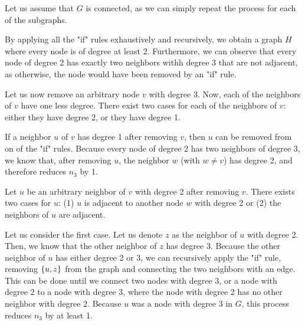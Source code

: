\documentclass{article}
\begin{document}




Let us assume that $G$ is connected, as we can simply repeat the process for each of the subgraphs. 

By applying all the "if" rules exhaustively and recursively, we obtain a graph $H$ where every node is of degree at least 2. Furthermore, we can observe that every node of degree 2 has exactly two neighbors withh degree 3 that are not adjacent, as otherwise, the node would have been removed by an "if" rule.

Let us now remove an arbitrary node $v$ with degree 3.
Now, each of the neighbors of $v$ have one less degree. There exist two cases for each of the neighbors of $v$: either they have degree 2, or they have degree 1.

If a neighbor $u$ of $v$ has degree 1 after removing $v$, then $u$ can be removed from on of the "if" rules. Because every node of degree 2 has two neighbors of degree 3, we know that, after removing $u$, the neighbor $w$ (with $w\neq v$) has degree 2, and therefore reduces $n_3$ by 1.

Let $u$ be an arbitrary neighbor of $v$ with degree 2 after removing $v$. There exists two cases for $u$: (1) $u$ is adjacent to another node $w$ with degree 2 or (2) the neighbors of $u$ are adjacent.

Let us consider the first case. Let us denote $z$ as the neighbor of $u$ with degree 2. Then, we know that the other neighbor of $z$ has degree 3. Because the other neighbor of $u$ has either degree 2 or 3, we can recursively apply the "if" rule, removing $\left\{ u, z \right\}$ from the graph and connecting the two neighbors with an edge. This can be done until we connect two nodes with degree 3, or a node with degree 2 to a node with degree 3, where the node with degree 2 has no other neighbor with degree 2. 
Because $u$ was a node with degree 3 in $G$, this process reduces $n_3$ by at least 1.
\end{document}
